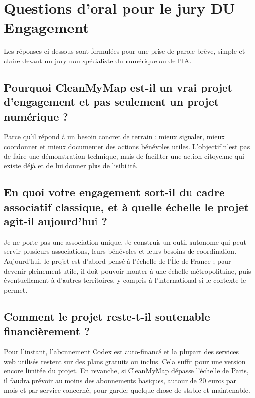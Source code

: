 \documentclass[
  10pt,
  a4paper,
  DIV=11,
  numbers=noendperiod,
  oneside]{scrreprt}
\begin{document}
\section{Questions d'oral pour le jury DU
Engagement}\label{questions-doral-pour-le-jury-du-engagement}

Les réponses ci-dessous sont formulées pour une prise de parole brève,
simple et claire devant un jury non spécialiste du numérique ou de l'IA.

\subsection{Pourquoi CleanMyMap est-il un vrai projet d'engagement et
pas seulement un projet numérique
?}\label{pourquoi-cleanmymap-est-il-un-vrai-projet-dengagement-et-pas-seulement-un-projet-numuxe9rique}

Parce qu'il répond à un besoin concret de terrain : mieux signaler,
mieux coordonner et mieux documenter des actions bénévoles utiles.
L'objectif n'est pas de faire une démonstration technique, mais de
faciliter une action citoyenne qui existe déjà et de lui donner plus de
lisibilité.

\subsection{En quoi votre engagement sort-il du cadre associatif
classique, et à quelle échelle le projet agit-il aujourd'hui
?}\label{en-quoi-votre-engagement-sort-il-du-cadre-associatif-classique-et-uxe0-quelle-uxe9chelle-le-projet-agit-il-aujourdhui}

Je ne porte pas une association unique. Je construis un outil autonome
qui peut servir plusieurs associations, leurs bénévoles et leurs besoins
de coordination. Aujourd'hui, le projet est d'abord pensé à l'échelle de
l'Île-de-France ; pour devenir pleinement utile, il doit pouvoir monter
à une échelle métropolitaine, puis éventuellement à d'autres
territoires, y compris à l'international si le contexte le permet.

\subsection{Comment le projet reste-t-il soutenable financièrement
?}\label{comment-le-projet-reste-t-il-soutenable-financiuxe8rement}

Pour l'instant, l'abonnement Codex est auto-financé et la plupart des
services web utilisés restent sur des plans gratuits ou inclus. Cela
suffit pour une version encore limitée du projet. En revanche, si
CleanMyMap dépasse l'échelle de Paris, il faudra prévoir au moins des
abonnements basiques, autour de 20 euros par mois et par service
concerné, pour garder quelque chose de stable et maintenable.
\end{document}
